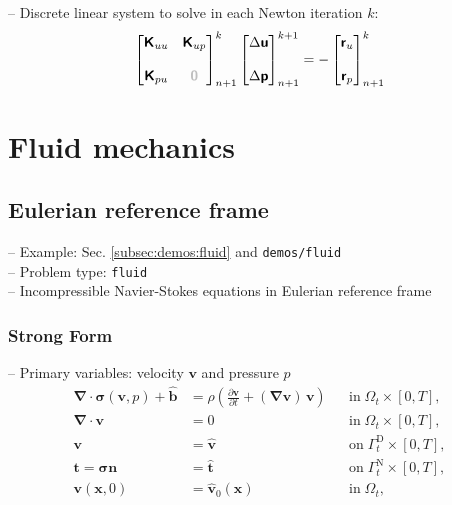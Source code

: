 \documentclass[a4paper,12pt]{report}
\newcommand{\bs}[1]{\boldsymbol{#1}}
\newcommand{\Om}{\mathit{\Omega}}
\newcommand{\Gm}{\mathit{\Gamma}}
\newcommand{\zerom}{\textcolor{lightgray}{\bs{\mathsf{0}}}}
\newcommand{\ROP}{\bs{\mathsf{r}}}
\begin{document}
-- Discrete linear system to solve in each Newton iteration $k$:
\begin{align}
\begin{bmatrix} \bs{\mathsf{K}}_{uu} & \bs{\mathsf{K}}_{up} \\ \\ \bs{\mathsf{K}}_{pu} & \zerom \end{bmatrix}_{n+1}^{k}\begin{bmatrix} \Delta\bs{\mathsf{u}} \\ \\ \Delta\bs{\mathsf{p}} \end{bmatrix}_{n+1}^{k+1}=-\begin{bmatrix} \ROP_{u} \\ \\ \ROP_{p} \end{bmatrix}_{n+1}^{k} \label{eq:lin_sys_solid_incomp}
\end{align}


\section{Fluid mechanics}\label{sec:fluid}

\subsection{Eulerian reference frame}\label{subsec:fluid_eulerian}

-- Example: Sec. \ref{subsec:demos:fluid} and \verb"demos/fluid"\\

-- Problem type: \verb.fluid.\\

-- Incompressible Navier-Stokes equations in Eulerian reference frame\\

\subsubsection{Strong Form}
-- Primary variables: velocity $\bs{v}$ and pressure $p$
\begin{align}
\bs{\nabla} \cdot \bs{\sigma}(\bs{v},p) + \hat{\bs{b}} &= \rho\left(\frac{\partial\bs{v}}{\partial t} + (\bs{\nabla}\bs{v})\,\bs{v}\right) &&\text{in} \; \mathit{\Om}_t \times [0, T], \label{eq:divsigma_ns} \\
\bs{\nabla}\cdot \bs{v} &= 0 &&\text{in} \; \mathit{\Om}_t \times [0, T],\label{eq:divv_ns}\\
\bs{v} &= \hat{\bs{v}} &&\text{on} \; \mathit{\Gm}_t^{\mathrm{D}} \times [0, T], \label{eq:bc_v_ns}\\
\bs{t} = \bs{\sigma}\bs{n} &= \hat{\bs{t}} &&\text{on} \; \mathit{\Gm}_t^{\mathrm{N}} \times [0, T], \label{eq:bc_N_ns}\\
\bs{v}(\bs{x},0) &= \hat{\bs{v}}_{0}(\bs{x}) &&\text{in} \; \mathit{\Om}_t, \label{eq:ini_v_ns}
\end{align}
\end{document}
